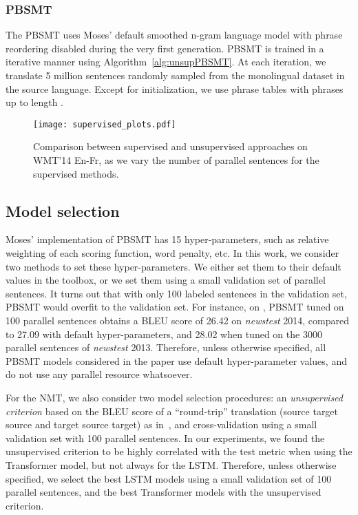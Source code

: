 \documentclass[11pt,a4paper]{article}
\begin{document}
\subsubsection{PBSMT}
The PBSMT uses Moses' default smoothed n-gram language model with phrase reordering disabled during the very first generation.  PBSMT is trained in a iterative manner using Algorithm~\ref{alg:unsupPBSMT}. At each iteration, we translate 5 million sentences randomly sampled from the monolingual dataset in the source language. Except for initialization, we use phrase tables with phrases up to length . 

\begin{figure}[t]
\texttt{[image: supervised\_plots.pdf]}
\vspace{-0.4cm}
   \caption{\small{Comparison between supervised and unsupervised approaches on WMT'14 En-Fr, as we vary the number of parallel sentences for the supervised methods. }}
    \label{fig:supVSunsup}
\vspace{-0.5cm}
\end{figure}

\subsection{Model selection}
\label{ms}
Moses' implementation of PBSMT has 15 hyper-parameters, such as relative weighting of each scoring function, word penalty, etc. 
In this work, we consider two methods to set these hyper-parameters. We either set them to their default values in the toolbox, or we set them using a small validation set of parallel sentences. 
It turns out that with only 100 labeled sentences in the validation set, PBSMT would overfit to the validation set. For instance, on , PBSMT tuned on 100 parallel sentences obtains a BLEU score of 26.42 on \textit{newstest} 2014, compared to 27.09 with default hyper-parameters, and 28.02 when tuned on the 3000 parallel sentences of \textit{newstest} 2013. Therefore, unless otherwise specified, all PBSMT models considered in the paper use default hyper-parameter values, and do not use any parallel resource whatsoever.

For the NMT, we also consider two model selection procedures: an \textit{unsupervised criterion} based on the BLEU score of a ``round-trip'' translation (source  target  source and target  source  target) as in~\citet{unsupNMTlample}, and 
cross-validation using a small validation set with 100 parallel sentences. In our experiments, we found the unsupervised criterion to be highly correlated with the test metric when using the Transformer model, but not always for the LSTM. Therefore, unless otherwise specified, we select the best LSTM models using a small validation set of 100 parallel sentences, and the best Transformer models with the unsupervised criterion.
\end{document}
